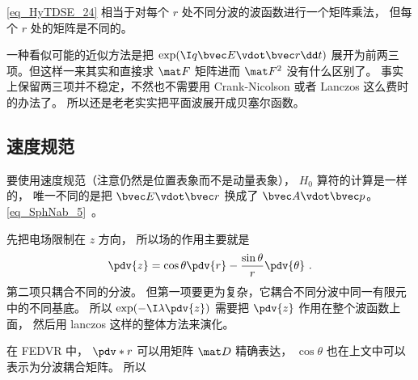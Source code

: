 \autoref{eq_HyTDSE_24} 相当于对每个 $r$ 处不同分波的波函数进行一个矩阵乘法， 但每个 $r$ 处的矩阵是不同的。

一种看似可能的近似方法是把 $\exp(\I q\bvec E\vdot\bvec r\dd t)$ 展开为前两三项。但这样一来其实和直接求 $\mat F$ 矩阵进而 $\mat F^2$ 没有什么区别了。 事实上保留两三项并不稳定，不然也不需要用 Crank-Nicolson 或者 Lanczos 这么费时的办法了。 所以还是老老实实把平面波展开成贝塞尔函数。

\subsection{速度规范}
要使用速度规范（注意仍然是位置表象而不是动量表象）， $H_0$ 算符的计算是一样的， 唯一不同的是把 $\bvec E\vdot \bvec r$ 换成了 $\bvec A\vdot \bvec p$。 \autoref{eq_SphNab_5}~。

先把电场限制在 $z$ 方向， 所以场的作用主要就是
\begin{equation}
\pdv{z} = \cos\theta\pdv{r} - \frac{\sin\theta}{r}\pdv{\theta}~.
\end{equation}
第二项只耦合不同的分波。 但第一项要更为复杂，它耦合不同分波中同一有限元中的不同基底。 所以 $\exp(-\I \lambda \pdv{z})$ 需要把 $\pdv{z}$ 作用在整个波函数上面， 然后用 lanczos 这样的整体方法来演化。

在 FEDVR 中， $\pdv*{r}$ 可以用矩阵 $\mat D$ 精确表达， $\cos\theta$ 也在上文中可以表示为分波耦合矩阵。 所以

